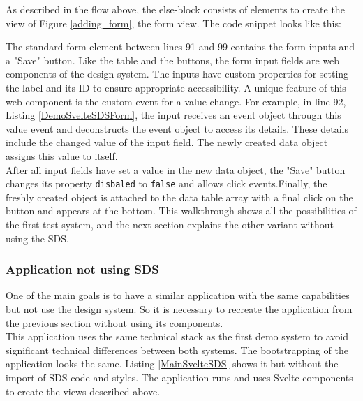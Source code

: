 As described in the flow above, the else-block consists of elements to create the view of Figure \ref{adding_form}, the form view. The code snippet looks like this:

The standard form element between lines 91 and 99 contains the form inputs and a "Save" button. Like the table and the buttons, the form input fields are web components of the design system. The inputs have custom properties for setting the label and its ID to ensure appropriate accessibility. A unique feature of this web component is the custom event for a value change. For example, in line 92, Listing \ref{DemoSvelteSDSForm}, the input receives an event object through this value event and deconstructs the event object to access its details. These details include the changed value of the input field. The newly created data object assigns this value to itself. \\
After all input fields have set a value in the new data object, the "Save" button changes its property \texttt{disbaled} to \texttt{false} and allows click events.Finally, the freshly created object is attached to the data table array with a final click on the button and appears at the bottom. This walkthrough shows all the possibilities of the first test system, and the next section explains the other variant without using the \ac{SDS}. 

\subsubsection{Application not using \ac{SDS}}
One of the main goals is to have a similar application with the same capabilities but not use the design system. So it is necessary to recreate the application from the previous section without using its components. \\
This application uses the same technical stack as the first demo system to avoid significant technical differences between both systems. The bootstrapping of the application looks the same. Listing \ref{MainSvelteSDS} shows it but without the import of SDS code and styles. The application runs and uses Svelte components to create the views described above. \\

